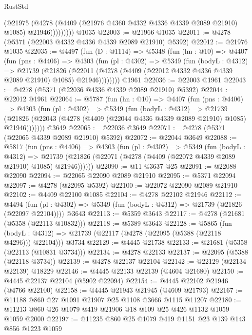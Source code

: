 \begin{lexlean}{RustStd}
\begin{coremodule}
                  (@21975
                    (@4278
                      (@4409 (@21976 @4360 @4332 @4336 @4339 @2089 @21910) @1085)
                      @21946)))))))))
    @1035
@22003 := @21966 @1035
@22011 := @4278 (@5371 (@22003 @4332 @4336 @4339 @2089 @21910) @5392)
@22012 := @21976 @1035
@22035 := @4497
    (fun (D : @1114) =>
    @5348
      (fun (hn : @10) =>
      @4407
        (fun (pns : @4406) =>
        @4303
          (fun (pl : @4302) =>
          @5349
            (fun (bodyL : @4312) =>
            @21739
              (@21826
                (@22011 (@4278 (@4409 (@22012 @4332 @4336 @4339 @2089 @21910) @1085) @21946))))))))
    @1961
@22036 := @22003 @1961
@22043 := @4278 (@5371 (@22036 @4336 @4339 @2089 @21910) @5392)
@22044 := @22012 @1961
@22064 := @5787
    (fun (hn : @10) =>
    @4407
      (fun (pns : @4406) =>
      @4303
        (fun (pl : @4302) =>
        @5349
          (fun (bodyL : @4312) =>
          @21739
            (@21826 (@22043 (@4278 (@4409 (@22044 @4336 @4339 @2089 @21910) @1085) @21946)))))))
    @3649
@22065 := @22036 @3649
@22071 := @4278 (@5371 (@22065 @4339 @2089 @21910) @5392)
@22072 := @22044 @3649
@22088 := @5817
    (fun (pns : @4406) =>
    @4303
      (fun (pl : @4302) =>
      @5349
        (fun (bodyL : @4312) =>
        @21739 (@21826 (@22071 (@4278 (@4409 (@22072 @4339 @2089 @21910) @1085) @21946))))))
@22090 := @11 @3637 @25
@22091 := @22088 @22090
@22094 := @22065 @22090 @2089 @21910
@22095 := @5371 @22094
@22097 := @4278 (@22095 @5392)
@22100 := @22072 @22090 @2089 @21910
@22102 := @4409 @22100 @1085
@22104 := @4278 @22102 @21946
@22112 := @4494
    (fun (pl : @4302) => @5349 (fun (bodyL : @4312) => @21739 (@21826 (@22097 @22104))))
    @3643
@22113 := @5359 @3643
@22117 := @4278 (@21681 (@5358 (@22113 @10832)))
@22118 := @5389 @3643
@22128 := @5865
    (fun (bodyL : @4312) => @21739 (@22117 (@4278 (@22095 (@5388 (@22118 @4296))) @22104)))
    @3734
@22129 := @4445 @21738
@22133 := @21681 (@5358 (@22113 (@10831 @3734)))
@22134 := @4278 @22133
@22137 := @22095 (@5388 (@22118 @3734))
@22139 := @4278 @22137 @22104
@22142 := @22129 (@22134 @22139) @18229
@22146 := @4445 @22133 @22139 (@4604 @21680)
@22150 := @4445 @22137 @22104 (@5902 @22094)
@22154 := @4445 @22102 @21946 (@4766 @22100)
@22158 := @4445 @21943 @21945 (@4609 @21793)
@22167 := @11188 @860 @27 @1091 @21907 @25 @1108 @3666 @1115 @11207
@22180 := @11213 @860 @26 @1079 @419 @21906 @18 @109 @25 @426 @1132 @1059 @1059 @2000
@22197 := @11235
    @860
    @25
    @1079
    @419
    @1151
    @23
    @139
    @143
    @856
    @1223
    @1059

\end{coremodule}
\end{lexlean}
